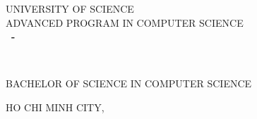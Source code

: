 \begin{titlepage}

\begin{center}
UNIVERSITY OF SCIENCE\\
ADVANCED PROGRAM IN COMPUTER SCIENCE\\[2cm]

{ \Large \bfseries \MakeUppercase{\tenSV ~-~ \mssv} \\[2cm] } %

{ \LARGE \bfseries \MakeUppercase{\tenKL} \\[2cm] } %

\Large BACHELOR OF SCIENCE IN COMPUTER SCIENCE\\[2cm]



\vfill
HO CHI MINH CITY, \the\year

\end{center}

\end{titlepage}